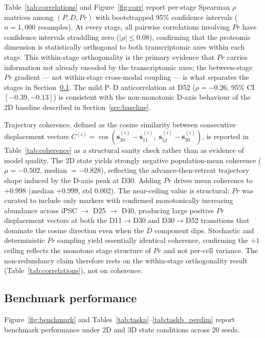 \documentclass[5p,times,twocolumn]{elsarticle}
\begin{document}
Table~\ref{tab:correlations} and Figure~\ref{fig:corr} report
per-stage Spearman $\rho$ matrices among $(P, D, Pr)$ with
bootstrapped 95\% confidence intervals ($n = 1{,}000$ resamples).
At every stage, all pairwise correlations involving $Pr$ have
confidence intervals straddling zero ($|\rho| \leq 0.08$),
confirming that the proteomic dimension is statistically
orthogonal to both transcriptomic axes within each stage.
This within-stage orthogonality is the primary evidence that
$Pr$ carries information not already encoded by the
transcriptomic axes; the between-stage $Pr$ gradient --- not
within-stage cross-modal coupling --- is what separates the
stages in Section~\ref{sec:res_bench}.
The mild P--D anticorrelation at D52 ($\rho = -0.26$,
95\% CI $[-0.39, -0.13]$) is consistent with the non-monotonic
D-axis behaviour of the 2D baseline described in
Section~\ref{sec:baseline}.

Trajectory coherence, defined as the cosine similarity between
consecutive displacement vectors
$C^{(i)} = \cos(\mathbf{s}^{(i)}_{30} - \mathbf{s}^{(i)}_{11},\;
\mathbf{s}^{(i)}_{52} - \mathbf{s}^{(i)}_{30})$,
is reported in Table~\ref{tab:coherence} as a structural sanity
check rather than as evidence of model quality.
The 2D state yields strongly negative population-mean coherence
($\mu = -0.502$, median $= -0.828$), reflecting the
advance-then-retreat trajectory shape induced by the D-axis
peak at D30.
Adding $Pr$ drives mean coherence to $+0.998$ (median $+0.999$,
std $0.002$).
The near-ceiling value is structural: $Pr$ was curated to
include only markers with confirmed monotonically increasing
abundance across iPSC $\to$ D25 $\to$ D40, producing large
positive $Pr$ displacement vectors at both the D11$\to$D30 and
D30$\to$D52 transitions that dominate the cosine direction even
when the $D$ component dips.
Stochastic and deterministic $Pr$ sampling yield essentially
identical coherence, confirming the $+1$ ceiling reflects the
monotone stage structure of $Pr$ and not per-cell variance.
The non-redundancy claim therefore rests on the within-stage
orthogonality result (Table~\ref{tab:correlations}), not on
coherence.

\subsection{\textbf{Benchmark performance}}
\label{sec:res_bench}

Figure~\ref{fig:benchmark} and
Tables~\ref{tab:taska}--\ref{tab:taskb_perdim} report benchmark
performance under 2D and 3D state conditions across 20 seeds.
\end{document}
